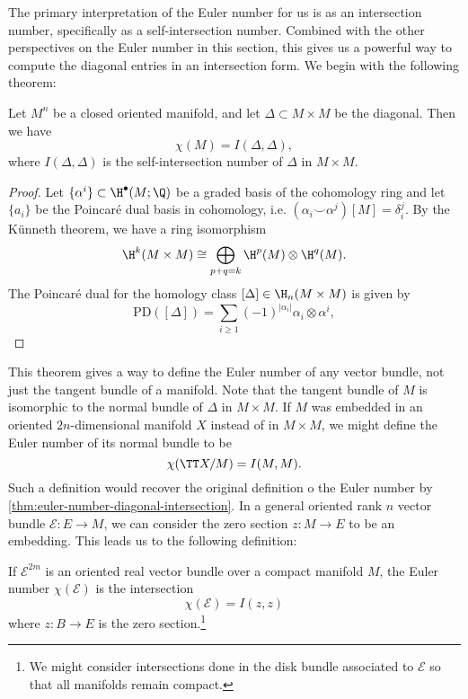The primary interpretation of the Euler number for us is as an intersection number, specifically as a self-intersection number. Combined with the other perspectives on the Euler number in this section, this gives us a powerful way to compute the diagonal entries in an intersection form. We begin with the following theorem: 
\begin{theorem}\label{thm:euler-number-diagonal-intersection}
  Let $M^n$ be a closed oriented manifold, and let $\Delta\subset M\times M$ be the diagonal. 
  Then we have
  \[
    \chi(M) = I(\Delta, \Delta),
  \]
  where $I(\Delta,\Delta)$ is the self-intersection number of $\Delta$ in $M\times M$.
\end{theorem}
\begin{proof}
  Let $\{\alpha^i\}\subset \H^\bullet(M; \Q)$ be a graded basis of the cohomology ring and let $\{a_i\}$ be the Poincar\'e dual basis in cohomology, i.e. $(\alpha_i\smile \alpha^j)[M]=\delta^j_i$. By the K\"unneth theorem, we have a ring isomorphism
  \[
    \H^{k}(M\times M) \cong \bigoplus_{p+q=k} \H^p(M)\otimes \H^q(M).
  \]
  The Poincar\'e dual for the homology class $[\Delta]\in \H_{n}(M\times M)$ is given by
  \[
      \mathrm{PD}([\Delta]) = \sum_{i\geq 1}(-1)^{|\alpha_i|}\alpha_i\otimes \alpha^i,
  \]
\end{proof}

This theorem gives a way to define the Euler number of any vector bundle, not just the tangent bundle of a manifold. Note that the tangent bundle of $M$ is isomorphic to the normal bundle of $\Delta$ in $M\times M$. If $M$ was embedded in an oriented $2n$-dimensional manifold $X$ instead of in $M\times M$, we might define the Euler number of its normal bundle to be
\[
    \chi(\TT X/M) = I(M,M).
\]
Such a definition would recover the original definition o the Euler number by \cref{thm:euler-number-diagonal-intersection}. In a general oriented rank $n$ vector bundle $\mathcal{E} : E \to M$, we can consider the zero section $z : M \to E$ to be an embedding. This leads us to the following definition:

\begin{definition}\label{def:euler-number-self-intersection}
  If $\mathcal{E}^{2m}$ is an oriented real vector bundle over a compact manifold $M$, 
	the Euler number $\chi(\mathcal{E})$ is the intersection
	\[
		\chi(\mathcal{E}) = I(z,z)
	\]
	where $z : B \to E$ is the zero section.\footnote{We might consider intersections done in the disk bundle associated to $\mathcal{E}$ so that all manifolds remain compact.}
\end{definition}


